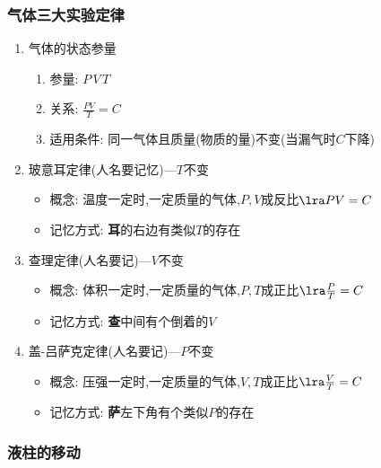 \documentclass{article}
\begin{document}
\vspace{2em}

\subsubsection{气体三大实验定律}
\begin{enumerate}[label = \arabic*]
    \item 气体的状态参量
          \begin{enumerate}[label = (\arabic*)]
              \item 参量: $P \, V \, T$
              \item 关系: $\frac{PV}{T} = C$
              \item 适用条件: 同一气体且质量(物质的量)不变(当漏气时$C$下降)
          \end{enumerate}
    \item 玻意耳定律(人名要记忆)---$T$不变
          \begin{itemize}
              \item 概念: 温度一定时,一定质量的气体,$P,V$成反比$\lra PV = C$
              \item 记忆方式: \textbf{耳}的右边有类似$T$的存在
          \end{itemize}
    \item 查理定律(人名要记)---$V$不变
          \begin{itemize}
              \item 概念: 体积一定时,一定质量的气体,$P,T$成正比$\lra \frac{P}{T} = C$
              \item 记忆方式: \textbf{查}中间有个倒着的$V$
          \end{itemize}
    \item 盖-吕萨克定律(人名要记)---$P$不变
          \begin{itemize}
              \item 概念: 压强一定时,一定质量的气体,$V,T$成正比$\lra \frac{V}{T} = C$
              \item 记忆方式: \textbf{萨}左下角有个类似$P$的存在
          \end{itemize}
        
\end{enumerate}

\vspace{2em}

\subsubsection{液柱的移动}
\end{document}
